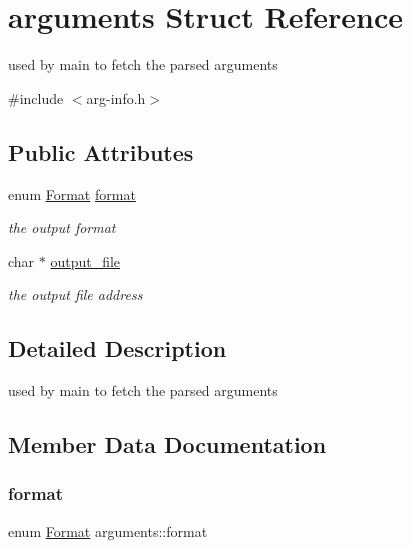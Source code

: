 \hypertarget{structarguments}{}\section{arguments Struct Reference}
\label{structarguments}


used by main to fetch the parsed arguments  




{\ttfamily \#include $<$arg-\/info.\+h$>$}

\subsection*{Public Attributes}
\begin{DoxyCompactItemize}
\item 
enum \hyperlink{arg-info_8h_ab4e88c89b3b7ea1735996cc4def22d58}{Format} \hyperlink{structarguments_af199740f9a4d285b640d5568d6372173}{format}
\begin{DoxyCompactList}\small\item\em the output format \end{DoxyCompactList}\item 
char $\ast$ \hyperlink{structarguments_ab967f3c192207878cfe15464aeafb551}{output\+\_\+file}
\begin{DoxyCompactList}\small\item\em the output file address \end{DoxyCompactList}\end{DoxyCompactItemize}


\subsection{Detailed Description}
used by main to fetch the parsed arguments 

\subsection{Member Data Documentation}
\mbox{\label{structarguments_af199740f9a4d285b640d5568d6372173}} 
\subsubsection{\texorpdfstring{format}{format}}
{\footnotesize\ttfamily enum \hyperlink{arg-info_8h_ab4e88c89b3b7ea1735996cc4def22d58}{Format} arguments\+::format}



